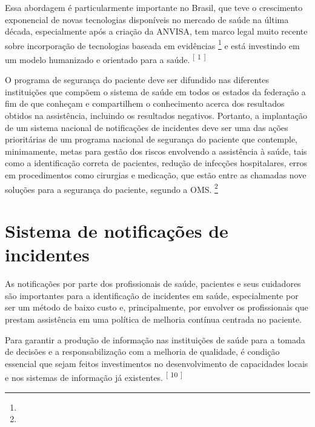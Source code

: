 \documentclass{article}
\begin{document}

Essa abordagem é particularmente importante no Brasil, que teve o crescimento exponencial
        de novas tecnologias disponíveis no mercado de saúde na última década, especialmente após a
        criação da ANVISA, tem marco legal muito recente sobre incorporação de tecnologias baseada
        em evidências %
\footnote{}  
 e está investindo em um modelo humanizado e orientado para a saúde. %
\textsuperscript{[}%
\textsuperscript{1}
\textsuperscript{]}  


O programa de segurança do paciente deve ser difundido nas diferentes instituições que
        compõem o sistema de saúde em todos os estados da federação a fim de que conheçam e
        compartilhem o conhecimento acerca dos resultados obtidos na assistência, incluindo os
        resultados negativos. Portanto, a implantação de um sistema nacional de notificações de
        incidentes deve ser uma das ações prioritárias de um programa nacional de segurança do
        paciente que contemple, minimamente, metas para gestão dos riscos envolvendo a assistência à
        saúde, tais como a identificação correta de pacientes, redução de infecções hospitalares,
        erros em procedimentos como cirurgias e medicação, que estão entre as chamadas nove soluções
        para a segurança do paciente, segundo a OMS. %
\footnote{}  

\section{%
Sistema de notificações de incidentes}

As notificações por parte dos profissionais de saúde, pacientes e seus cuidadores são
        importantes para a identificação de incidentes em saúde, especialmente por ser um método de
        baixo custo e, principalmente, por envolver os profissionais que prestam assistência em uma
        política de melhoria contínua centrada no paciente.

Para garantir a produção de informação nas instituições de saúde para a tomada de decisões
        e a responsabilização com a melhoria de qualidade, é condição essencial que sejam feitos
        investimentos no desenvolvimento de capacidades locais e nos sistemas de informação já
        existentes. %
\textsuperscript{[}%
\textsuperscript{10}
\textsuperscript{]}  
\end{document}
